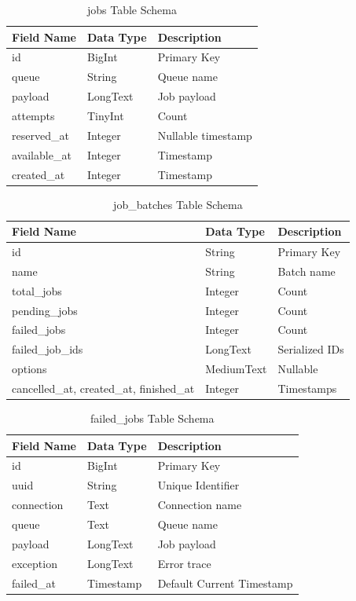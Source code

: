 \begin{longtable}{|l|l|p{7.5cm}|}
\caption{jobs Table Schema} \\
\hline
\textbf{Field Name} & \textbf{Data Type} & \textbf{Description} \\ \hline
id & BigInt & Primary Key \\ \hline
queue & String & Queue name \\ \hline
payload & LongText & Job payload \\ \hline
attempts & TinyInt & Count \\ \hline
reserved\_at & Integer & Nullable timestamp \\ \hline
available\_at & Integer & Timestamp \\ \hline
created\_at & Integer & Timestamp \\ \hline
\end{longtable}

\begin{longtable}{|l|l|p{7.5cm}|}
\caption{job\_batches Table Schema} \\
\hline
\textbf{Field Name} & \textbf{Data Type} & \textbf{Description} \\ \hline
id & String & Primary Key \\ \hline
name & String & Batch name \\ \hline
total\_jobs & Integer & Count \\ \hline
pending\_jobs & Integer & Count \\ \hline
failed\_jobs & Integer & Count \\ \hline
failed\_job\_ids & LongText & Serialized IDs \\ \hline
options & MediumText & Nullable \\ \hline
cancelled\_at, created\_at, finished\_at & Integer & Timestamps \\ \hline
\end{longtable}

\begin{longtable}{|l|l|p{7.5cm}|}
\caption{failed\_jobs Table Schema} \\
\hline
\textbf{Field Name} & \textbf{Data Type} & \textbf{Description} \\ \hline
id & BigInt & Primary Key \\ \hline
uuid & String & Unique Identifier \\ \hline
connection & Text & Connection name \\ \hline
queue & Text & Queue name \\ \hline
payload & LongText & Job payload \\ \hline
exception & LongText & Error trace \\ \hline
failed\_at & Timestamp & Default Current Timestamp \\ \hline
\end{longtable}

